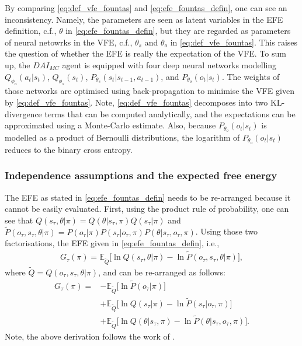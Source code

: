 \documentclass[twoside,11pt]{article}
\begin{document}
By comparing \eqref{eq:def_vfe_fountas} and \eqref{eq:efe_fountas_defin}, one can see an inconsistency. Namely, the parameters are seen as latent variables in the EFE definition, c.f., $\theta$ in \eqref{eq:efe_fountas_defin}, but they are regarded as parameters of neural netowrks in the VFE, c.f., $\theta_s$ and $\theta_o$ in \ref{eq:def_vfe_fountas}. This raises the question of whether the EFE is really the expectation of the VFE. To sum up, the $DAI_{MC}$ agent is equipped with four deep neural networks modelling $Q_{\phi_a}(a_t|s_t)$, $Q_{\phi_s}(s_t)$, $P_{\theta_s}(s_t|s_{t-1},a_{t-1})$, and $P_{\theta_o}(o_t|s_t)$. The weights of those networks are optimised using back-propagation to minimise the VFE given by \eqref{eq:def_vfe_fountas}. Note, \eqref{eq:def_vfe_fountas} decomposes into two KL-divergence terms that can be computed analytically, and the expectations can be approximated using a Monte-Carlo estimate. Also, because $P_{\theta_o}(o_t|s_t)$ is modelled as a product of Bernoulli distributions, the logarithm of $P_{\theta_o}(o_t|s_t)$ reduces to the binary cross entropy.

\subsubsection{Independence assumptions and the expected free energy}

The EFE as stated in \eqref{eq:efe_fountas_defin} needs to be re-arranged because it cannot be easily evaluated. First, using the product rule of probability, one can see that $Q(s_\tau, \theta|\pi) = Q(\theta|s_\tau,\pi)Q(s_\tau|\pi)$ and $\tilde{P}(o_\tau,s_\tau,\theta|\pi) = P(o_\tau|\pi)P(s_\tau|o_\tau,\pi)P(\theta|s_\tau,o_\tau,\pi)$. Using those two factorisations, the EFE given in \eqref{eq:efe_fountas_defin}, i.e.,
\begin{align*}
G_{\tau}(\pi) = \mathbb{E}_{\tilde{Q}}\Big[ \ln Q(s_\tau, \theta|\pi) - \ln \tilde{P}(o_\tau, s_\tau,\theta|\pi) \Big],
\end{align*}
where $\tilde{Q} = Q(o_\tau, s_\tau, \theta|\pi)$, and can be re-arranged as follows:
\begin{align}
G_{\tau}(\pi) = &- \mathbb{E}_{\tilde{Q}}\Big[ \ln \tilde{P}(o_\tau|\pi)\Big]\nonumber\\
&+ \mathbb{E}_{\tilde{Q}}\Big[ \ln Q(s_\tau|\pi) - \ln \tilde{P}(s_\tau|o_\tau, \pi) \Big]\nonumber\\
&+ \mathbb{E}_{\tilde{Q}}\Big[ \ln Q(\theta|s_\tau, \pi) - \ln \tilde{P}(\theta|s_\tau,o_\tau,\pi) \Big].\label{eq:efe_rearrangedd}
\end{align}
Note, the above derivation follows the work of \citet{DeepAIwithMCMC}.
\end{document}
